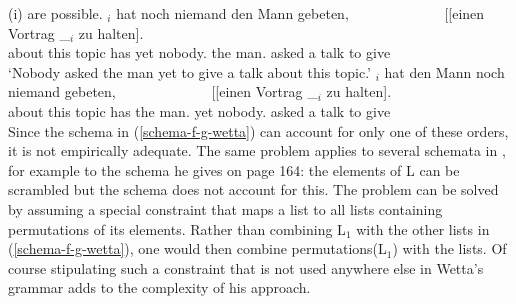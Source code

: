 \begin{exe}
\begin{xlist}
{  (i) are possible.
\eal
\ex 
{}$_i$ hat noch niemand den Mann gebeten,~~~~~~~~~~~~~ [[einen Vortrag \_$_i$ zu halten].\\
     \spacebr{}about this topic  has yet  nobody.\nom{}  the man.\acc{}  asked    \hspaceThis{[[}a
         talk {} to give\\
\glt `Nobody asked the man yet to give a talk about this topic.'
\ex 
{}$_i$ hat den Mann noch niemand gebeten,~~~~~~~~~~~~~ [[einen Vortrag \_$_i$ zu halten].\\
     \spacebr{}about this topic  has the man.\acc{} yet  nobody.\nom{}    asked    \hspaceThis{[[}a
         talk {} to give\\    
\zl
  Since the schema in (\ref{schema-f-g-wetta}) can account for only one of these orders, it is not empirically
  adequate. The same problem applies to several schemata in , for example to the
  schema he gives on page 164: the elements of L can be scrambled but the schema does not account
  for this. The problem can be solved by assuming a special constraint that maps
  a list to all lists containing permutations of its elements. Rather than combining L$_1$ with the other lists in
  (\ref{schema-f-g-wetta}), one would then combine permutations(L$_1$) with the lists. Of course
  stipulating such a constraint that is not used anywhere else in Wetta's grammar adds to the complexity of his approach.
}


\end{xlist}
\end{exe}

